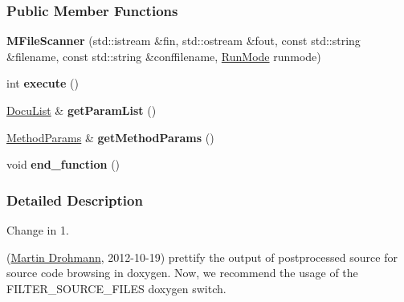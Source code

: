 \subsubsection*{Public Member Functions}
\begin{DoxyCompactItemize}
\item 
\hypertarget{class_m_file_scanner_ac26ee87e796c8c74996a2d4879225a62}{}{\bfseries M\+File\+Scanner} (std\+::istream \&fin, std\+::ostream \&fout, const std\+::string \&filename, const std\+::string \&conffilename, \hyperlink{struct_run_mode}{Run\+Mode} runmode)\label{class_m_file_scanner_ac26ee87e796c8c74996a2d4879225a62}

\item 
\hypertarget{class_m_file_scanner_abd8067b4fc2b84861f80119912d1d39c}{}int {\bfseries execute} ()\label{class_m_file_scanner_abd8067b4fc2b84861f80119912d1d39c}

\item 
\hypertarget{class_m_file_scanner_aa7df3bf624f1156d6b28d89eb9658e1b}{}\hyperlink{classordered__map}{Docu\+List} \& {\bfseries get\+Param\+List} ()\label{class_m_file_scanner_aa7df3bf624f1156d6b28d89eb9658e1b}

\item 
\hypertarget{class_m_file_scanner_af84523b3dada909aff99a9a6352d31b0}{}\hyperlink{struct_method_params}{Method\+Params} \& {\bfseries get\+Method\+Params} ()\label{class_m_file_scanner_af84523b3dada909aff99a9a6352d31b0}

\item 
\hypertarget{class_m_file_scanner_aa410226cad9cb8e77039cce0fc9ca1dc}{}void {\bfseries end\+\_\+function} ()\label{class_m_file_scanner_aa410226cad9cb8e77039cce0fc9ca1dc}

\end{DoxyCompactItemize}


\subsubsection{Detailed Description}
\begin{DoxyRefDesc}{Change in 1.}
\item[\hyperlink{changelog1_4__changelog1_4000003}{Change in 1.\+4}](\hyperlink{developers_md}{Martin Drohmann}, 2012-\/10-\/19) prettify the output of postprocessed source for source code browsing in doxygen. Now, we recommend the usage of the F\+I\+L\+T\+E\+R\+\_\+\+S\+O\+U\+R\+C\+E\+\_\+\+F\+I\+L\+E\+S doxygen switch.\end{DoxyRefDesc}


